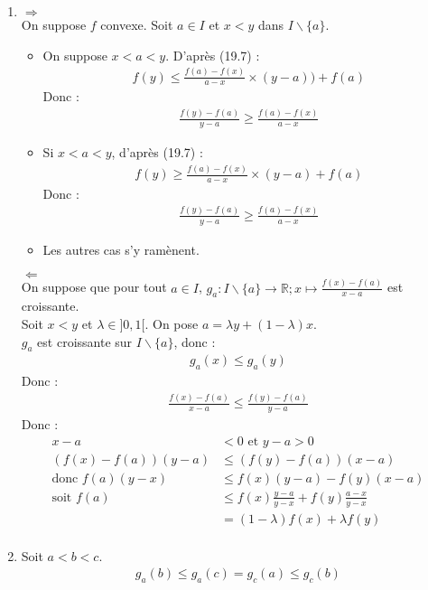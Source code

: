\documentclass[../main.tex]{subfiles}
\begin{document}
\begin{enumerate}
    \item $\boxed{\Rightarrow}$ \\
    On suppose $f$ convexe. Soit $a \in I$ et $x < y$ dans $I\backslash\{a\}$.
    \begin{itemize}
        \item On suppose $x < a < y$. D'après (19.7) : 
        \begin{align*}
            f(y) \leq \frac{f(a) - f(x)}{a-x} \times (y-a)) + f(a)
        \end{align*}
        Donc :
        \begin{align*}
            \frac{f(y) - f(a)}{y-a} \geq \frac{f(a) - f(x)}{a-x}
        \end{align*}
        \item Si $x < a < y$, d'après (19.7) :
        \begin{align*}
            f(y) \geq \frac{f(a) - f(x)}{a-x} \times (y-a) + f(a)
        \end{align*}
        Donc :
        \begin{align*}
            \frac{f(y) - f(a)}{y-a} \geq \frac{f(a) - f(x)}{a-x}
        \end{align*}
        \item Les autres cas s'y ramènent. 
    \end{itemize} 

    \noindent$\boxed{\Leftarrow}$ \\
    On suppose que pour tout $a \in I$, $g_a:I\backslash\{a\}\to \mathbb{R}; x\mapsto \frac{f(x) - f(a)}{x - a}$ est croissante. \\
    Soit $x < y$ et $\lambda \in ]0, 1[$. On pose $a = \lambda y + (1-\lambda)x$. \\
    $g_a$ est croissante sur $I\backslash\{a\}$, donc :
    \begin{align*}
        g_a(x) \leq g_a(y)
    \end{align*}
    Donc :
    \begin{align*}
        \frac{f(x) - f(a)}{x-a} \leq \frac{f(y) - f(a)}{y-a}
    \end{align*}
    Donc : 
    \begin{align*}
        x-a &< 0 \text{ et } y-a > 0 \\
        (f(x) - f(a))(y-a) &\leq (f(y) - f(a))(x-a) \\
        \text{donc } f(a)(y-x) &\leq f(x)(y-a) - f(y)(x-a) \\
        \text{soit } f(a) &\leq f(x) \frac{y-a}{y-x} + f(y) \frac{a-x}{y-x} \\
        &= (1 - \lambda)f(x) + \lambda f(y) \\
    \end{align*}

    \item Soit $a < b < c$. \\
    \begin{align*}
        g_a(b) \leq g_a(c) = g_c(a) \leq g_c(b)
    \end{align*}
\end{enumerate}
\end{document}
